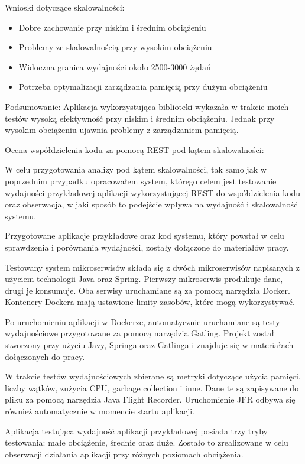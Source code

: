 \documentclass[runningheads,12pt]{llncs}
\begin{document}
Wnioski dotyczące skalowalności: 
\begin{itemize} 
    \item Dobre zachowanie przy niskim i średnim obciążeniu 
    \item Problemy ze skalowalnością przy wysokim obciążeniu 
    \item Widoczna granica wydajności około 2500-3000 żądań 
    \item Potrzeba optymalizacji zarządzania pamięcią przy dużym obciążeniu 
\end{itemize}

Podsumowanie: Aplikacja wykorzystująca biblioteki wykazała w trakcie moich testów wysoką efektywność przy niskim i średnim obciążeniu. Jednak przy wysokim obciążeniu ujawnia problemy z zarządzaniem pamięcią.

\newpage


Ocena współdzielenia kodu za pomocą REST pod kątem skalowalności:

W celu przygotowania analizy pod kątem skalowalności, tak samo jak w poprzednim przypadku opracowałem system, którego celem jest testowanie wydajności przykładowej aplikacji wykorzystującej REST do współdzielenia kodu oraz obserwacja, w jaki sposób to podejście wpływa na wydajność i skalowalność systemu.

Przygotowane aplikacje przykładowe oraz kod systemu, który powstał w celu sprawdzenia i porównania wydajności, zostały dołączone do materiałów pracy.

Testowany system mikroserwisów składa się z dwóch mikroserwisów napisanych z użyciem technologii Java oraz Spring. Pierwszy mikroserwis produkuje dane, drugi je konsumuje. Oba serwisy uruchamiane są za pomocą narzędzia Docker. Kontenery Dockera mają ustawione limity zasobów, które mogą wykorzystywać.

Po uruchomieniu aplikacji w Dockerze, automatycznie uruchamiane są testy wydajnościowe przygotowane za pomocą narzędzia Gatling. Projekt został stworzony przy użyciu Javy, Springa oraz Gatlinga i znajduje się w materiałach dołączonych do pracy.

W trakcie testów wydajnościowych zbierane są metryki dotyczące użycia pamięci, liczby wątków, zużycia CPU, garbage collection i inne. Dane te są zapisywane do pliku za pomocą narzędzia Java Flight Recorder. Uruchomienie JFR odbywa się również automatycznie w momencie startu aplikacji.

Aplikacja testująca wydajność aplikacji przykładowej posiada trzy tryby testowania: małe obciążenie, średnie oraz duże. Zostało to zrealizowane w celu obserwacji działania aplikacji przy różnych poziomach obciążenia.
\end{document}
